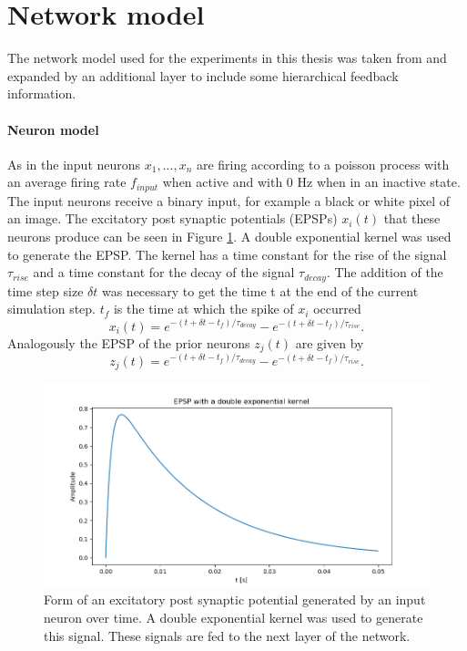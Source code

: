 \section{Network model}

The network model used for the experiments in this thesis was taken from \citet{nessler} and expanded by an additional layer to include some hierarchical feedback information.

\paragraph{Neuron model}
As in \citet{nessler} the input neurons $x_1,...,x_n$ are firing according to a poisson process with an average firing rate $f_{input}$ when active and with 0 Hz when in an inactive state. The input neurons receive a binary input, for example a black or white pixel of an image. The excitatory post synaptic potentials (EPSPs) $x_i(t)$ that these neurons produce can be seen in Figure \ref{fig:XSpike}. A double exponential kernel was used to generate the EPSP. The kernel has a time constant for the rise of the signal $\tau_{rise}$  and a time constant for the decay of the signal $\tau_{decay}$. The addition of the time step size $\delta t$ was necessary to get the time t at the end of the current simulation step. $t_f$ is the time at which the spike of $x_i$ occurred
\begin{equation}
\label{eqn:EPSP}
x_i(t) = e^{-(t + \delta t - t_f) / \tau_{decay}} - e^{-(t + \delta t - t_f) / \tau_{rise}}.
\end{equation}
Analogously the EPSP of the prior neurons $z_j(t)$ are given by
\begin{equation}
\label{eqn:EPSPPrior}
z_j(t) = e^{-(t + \delta t - t_f) / \tau_{decay}} - e^{-(t + \delta t - t_f) / \tau_{rise}}.
\end{equation}

\begin{figure}
  \includegraphics[width=\linewidth]{figures/XSpike.png}
  \caption{Form of an excitatory post synaptic potential generated by an input neuron over time. A double exponential kernel was used to generate this signal. These signals are fed to the next layer of the network. }
  \label{fig:XSpike}
\end{figure}

